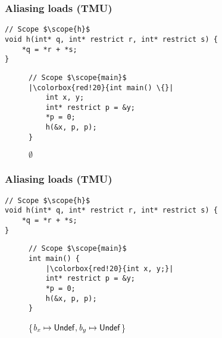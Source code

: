 \begin{frame}[fragile]
\frametitle{Aliasing loads (TMU)}
\begin{verbatim}
// Scope $\scope{h}$
void h(int* q, int* restrict r, int* restrict s) {
    *q = *r + *s; 
}
\end{verbatim}

\begin{figure}[h]
\centering
\begin{minipage}{.36\textwidth}
\begin{verbatim}
// Scope $\scope{main}$
|\colorbox{red!20}{int main() \{}|
    int x, y;
    int* restrict p = &y;
    *p = 0; 
    h(&x, p, p);
}
\end{verbatim}
\end{minipage}%
\begin{minipage}{.674\textwidth}
\executionannotation
{
    $\emptyset$
}
{
}
\end{minipage}
\end{figure}

\end{frame}




\begin{frame}[fragile]
\frametitle{Aliasing loads (TMU)}
\begin{verbatim}
// Scope $\scope{h}$
void h(int* q, int* restrict r, int* restrict s) {
    *q = *r + *s; 
}
\end{verbatim}

\begin{figure}[h]
\centering
\begin{minipage}{.36\textwidth}
\begin{verbatim}
// Scope $\scope{main}$
int main() {
    |\colorbox{red!20}{int x, y;}|
    int* restrict p = &y;
    *p = 0; 
    h(&x, p, p);
}
\end{verbatim}
\end{minipage}%
\begin{minipage}{.64\textwidth}
\executionannotation
{
\{\colorbox{red!20}{$\textit{b}_x \mapsto \mathsf{Undef}, \textit{b}_y \mapsto \mathsf{Undef}$}\}
}
{
}
\end{minipage}
\end{figure}

\end{frame}


